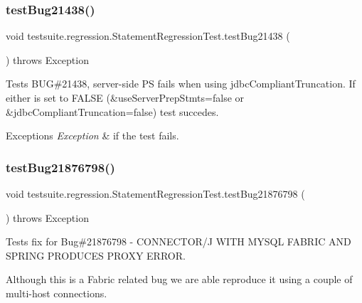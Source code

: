 \subsubsection{\texorpdfstring{test\+Bug21438()}{testBug21438()}}
{\footnotesize\ttfamily void testsuite.\+regression.\+Statement\+Regression\+Test.\+test\+Bug21438 (\begin{DoxyParamCaption}{ }\end{DoxyParamCaption}) throws Exception}

Tests B\+UG\#21438, server-\/side PS fails when using jdbc\+Compliant\+Truncation. If either is set to F\+A\+L\+SE (\&use\+Server\+Prep\+Stmts=false or \&jdbc\+Compliant\+Truncation=false) test succedes.


\begin{DoxyExceptions}{Exceptions}
{\em Exception} & if the test fails. \\
\hline
\end{DoxyExceptions}
\mbox{\label{classtestsuite_1_1regression_1_1_statement_regression_test_a7c2127e901386b163bff95c5a884f307}} 
\subsubsection{\texorpdfstring{test\+Bug21876798()}{testBug21876798()}}
{\footnotesize\ttfamily void testsuite.\+regression.\+Statement\+Regression\+Test.\+test\+Bug21876798 (\begin{DoxyParamCaption}{ }\end{DoxyParamCaption}) throws Exception}

Tests fix for Bug\#21876798 -\/ C\+O\+N\+N\+E\+C\+T\+O\+R/J W\+I\+TH M\+Y\+S\+QL F\+A\+B\+R\+IC A\+ND S\+P\+R\+I\+NG P\+R\+O\+D\+U\+C\+ES P\+R\+O\+XY E\+R\+R\+OR.

Although this is a Fabric related bug we are able reproduce it using a couple of multi-\/host connections. \mbox{\label{classtestsuite_1_1regression_1_1_statement_regression_test_ae2acdb736d0a4481a43f894bd9f40499}} 
